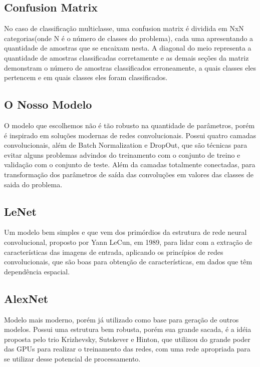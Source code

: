 \documentclass[conference]{IEEEtran}
\begin{document}
\subsection{Confusion Matrix}
No caso de classificação multiclasse, uma confusion matrix é dividida em NxN categorias(onde N é o número de classes do problema), cada uma apresentando a quantidade de amostras que se encaixam nesta.
A diagonal do meio representa a quantidade de amostras classificadas corretamente e as demais seções da matriz demonstram o número de amostras classificados erroneamente, a quais classes eles pertencem e em quais classes eles foram classificados.

\cite{metrics}




\subsection{O Nosso Modelo}
O modelo que escolhemos não é tão robusto na quantidade de parâmetros, porém é inspirado em soluções modernas de redes convolucionais.
Possui quatro camadas convolucionais, além de Batch Normalization e DropOut, que são técnicas para evitar alguns problemas advindos do treinamento com o conjunto de treino e validação com o conjunto de teste. Além da camadas totalmente conectadas, para transformação dos parâmetros de saída das convoluções em valores das classes de saida do problema.

\subsection{LeNet}
Um modelo bem simples e que vem dos primórdios da estrutura de rede neural convolucional, proposto por Yann LeCun, em 1989, para lidar com a extração de características das imagens de entrada, aplicando os princípios de redes convolucionais, que são boas para obtenção de características, em dados que têm dependência espacial. 

\subsection{AlexNet}
Modelo mais moderno, porém já utilizado como base para geração de outros modelos. Possui uma estrutura bem robusta, porém sua grande sacada, é a idéia proposta pelo trio Krizhevsky, Sutskever e Hinton, que utilizou do grande poder das GPUs para realizar o treinamento das redes, com uma rede apropriada para se utilizar desse potencial de processamento.
\end{document}
